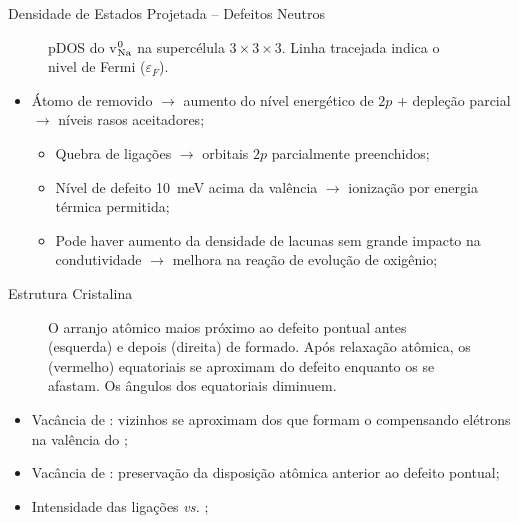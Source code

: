 \begin{frame}[allowframebreaks]{Densidade de Estados Projetada -- Defeitos Neutros}
\begin{figure}[t]
		\caption{pDOS do v$_{\ce{Na}}^0$ na supercélula $3\times3\times3$. Linha tracejada indica o nivel de Fermi ($\varepsilon_F$).\label{fig:pdosNeuVac_vNa}}
	\end{figure}
	\begin{itemize}
		\item Átomo de  removido $\to$ aumento do nível energético de  $2p$ $+$ depleção parcial $\to$ \alert{níveis rasos aceitadores};
		\begin{itemize}
			\item Quebra de ligações  $\to$ orbitais  $2p$ parcialmente preenchidos;
			\item Nível de defeito \SI{10}{\milli\electronvolt} acima da valência $\to$ ionização por energia térmica permitida;
			\item Pode haver \alert{aumento da densidade de lacunas} sem grande impacto na condutividade $\to$ melhora na reação de evolução de oxigênio;
		\end{itemize}
	\end{itemize}\framebreak
\end{frame}
\begin{frame}{Estrutura Cristalina}
	\begin{figure}[htb]
		\centering
		
		\caption{O arranjo atômico maios próximo ao defeito pontual antes (esquerda) e depois (direita) de formado. Após relaxação atômica, os  (vermelho) equatoriais se aproximam do defeito enquanto os  se afastam. Os ângulos  dos  equatoriais diminuem.}
	\end{figure}
	\begin{itemize}
		\item Vacância de :  vizinhos se aproximam dos  que formam o  compensando elétrons na valência do ;
		\item Vacância de : preservação da disposição atômica anterior ao defeito pontual;
		\item Intensidade das ligações  \textit{vs.} ;
	\end{itemize}
\end{frame}
